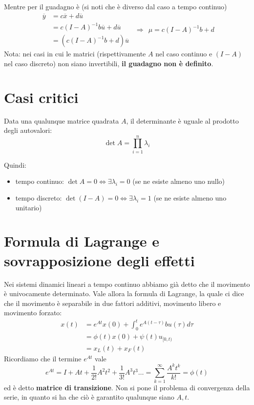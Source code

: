 \documentclass[10pt,a4paper]{book}
\begin{document}
Mentre per il guadagno è (si noti che è diverso dal caso a tempo continuo)
\begin{equation*}
	\begin{aligned}
		\overline{y} & =c\overline{x} +d\overline{u}               \\
		             & =c(I-A)^{-1} b\overline{u} +d\overline{u}  \\
		             & =\left(c(I-A)^{-1} b+d\right)\overline{u} 
	\end{aligned} \ \ \Rightarrow \ \ \boxed{\mu =c(I-A)^{-1} b+d}
\end{equation*}
Nota: nei casi in cui le matrici (rispettivamente $A$ nel caso continuo e $(I-A)$ nel caso discreto) non siano invertibili, \textbf{il guadagno non è definito}.
\section{Casi critici}
\begin{ricalg}
	Data una qualunque matrice quadrata $A$, il determinante è uguale al prodotto degli autovalori:
	\begin{equation*}
		\det A=\prod ^n_{i=1} \lambda _i
	\end{equation*}
\end{ricalg}
Quindi:
\begin{itemize}
	\item tempo continuo: $\det A=0\Leftrightarrow \exists \lambda _i =0$ (se ne esiste almeno uno nullo)
	\item tempo discreto: $\det(I-A) =0\Leftrightarrow \exists \lambda _i =1$ (se ne esiste almeno uno unitario)
\end{itemize}
\section{Formula di Lagrange e sovrapposizione degli effetti}

Nei sistemi dinamici lineari a tempo continuo abbiamo già detto che il movimento è univocamente determinato. Vale allora la formula di Lagrange, la quale ci dice che il movimento è separabile in due fattori additivi, movimento libero e movimento forzato:
\begin{equation}
	\boxed{
		\begin{aligned}
			{\displaystyle x(t)} & {\displaystyle =e^{At} x(0) +\int ^t_0 e^{A(t-\tau)} bu(\tau) d\tau } \\
			                     & =\phi (t) x(0) +\psi (t) u_{[ 0,t)}                                              \\
			                     & =x_L(t) +x_F(t)                                                                  
		\end{aligned}
	}
\end{equation}
Ricordiamo che il termine ${\displaystyle e^{At}}$ vale
\begin{equation*}
	{\displaystyle e^{At} =I+At+\frac{1}{2!} A^2 t^2 +\frac{1}{3!} A^3 t^3 \dotsc =\sum\limits ^{\infty }_{k=1}\frac{A^k t^k}{k!} =\phi (t)}
\end{equation*}
ed è detto \textbf{matrice di transizione}. Non si pone il problema di convergenza della serie, in quanto si ha che ciò è garantito qualunque siano $A,t$.
\end{document}
